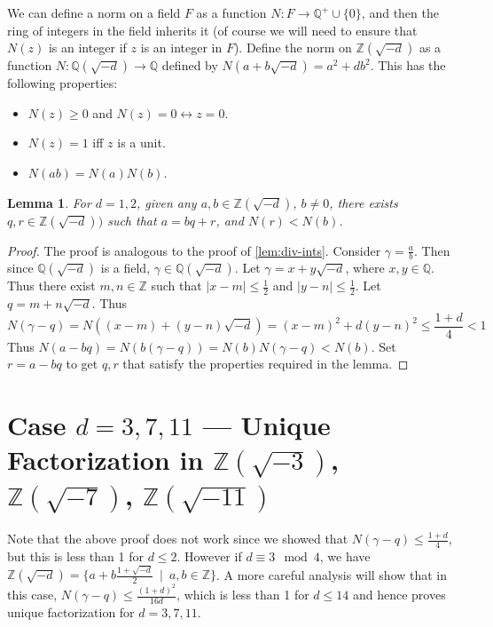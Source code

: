 \documentclass[12pt]{article}
\newcommand{\ints}{{\mathbb{Z}}}
\newcommand{\qf}{{\mathbb{Q}}}
\newtheorem{lemma}[thm]{Lemma}
\begin{document}
We can define a norm on a field $F$ as a function $N: F \to \qf^+ \cup \{ 0\}$, and then the ring of integers in the field inherits it (of course we will need to ensure that $N(z)$ is an integer if $z$ is an integer in $F$).
Define the norm on $\ints(\sqrt{-d})$ as a function $N: \qf(\sqrt{-d}) \to \qf$ defined by $N(a + b\sqrt{-d}) = a^2 + db^2$. This has the following properties:
\begin{itemize}
\item $N(z) \geq 0$ and $N(z) = 0 \leftrightarrow z = 0$.
\item $N(z) = 1$ iff $z$ is a unit.
\item $N(ab) = N(a)N(b)$.
\end{itemize}

\begin{lemma}
For $d = 1, 2$, given any $a, b \in \ints(\sqrt{-d})$, $b \neq 0$, there exists $q, r \in \ints(\sqrt{-d}))$ such that $a = bq + r$, and $N(r) < N(b)$.
\end{lemma}
\begin{proof}
The proof is analogous to the proof of \cref{lem:div-ints}. Consider $\gamma = \frac{a}{b}$. Then since $\qf(\sqrt{-d})$ is a field, $\gamma \in \qf(\sqrt{-d})$. Let $\gamma = x + y\sqrt{-d}$, where $x, y \in \qf$. 
Thus there exist $m, n \in \ints$ such that $|x - m| \leq \frac{1}{2}$ and $|y - n| \leq \frac{1}{2}$. Let $q = m + n\sqrt{-d}$.  Thus
$$
N(\gamma - q) = N((x - m) + (y - n)\sqrt{-d}) = (x - m)^2 + d(y - n)^2 \leq \frac{1 + d}{4} < 1
$$
Thus $N(a - bq) = N(b(\gamma - q)) = N(b) N(\gamma - q) < N(b)$. Set $r = a - bq$ to get $q, r$ that satisfy the properties required in the lemma.
\end{proof}

\section{Case $d = 3, 7, 11$ --- Unique Factorization in $\ints(\sqrt{-3})$, $\ints(\sqrt{-7})$, $\ints(\sqrt{-11})$}

Note that the above proof does not work since we showed that $N(\gamma - q) \leq \frac{1 + d}{4}$, but this is less than 1 for $d \leq 2$.  However if $d \equiv 3 \mod 4$, we have $\ints(\sqrt{-d}) = \{a + b\frac{1 + \sqrt{-d}}{2}\ \mid\  a, b \in \ints\}$. A more careful analysis will show that in this case, $N(\gamma - q) \leq \frac{(1 + d)^2}{16d}$, which is less than 1 for $d \leq 14$ and hence proves unique factorization for $d = 3, 7, 11$.
\end{document}

